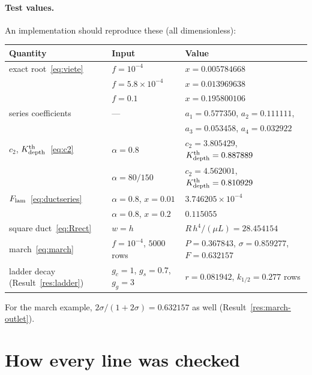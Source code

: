 \paragraph{Test values.} An implementation should reproduce these (all dimensionless):
\begin{center}
\small
\begin{tabular}{@{}lll@{}}
\toprule
Quantity & Input & Value \\
\midrule
exact root~\eqref{eq:viete} & $f=10^{-4}$ & $x=0.005784668$ \\
 & $f=5.8\times10^{-4}$ & $x=0.013969638$ \\
 & $f=0.1$ & $x=0.195800106$ \\
series coefficients & --- & $a_1=0.577350$, $a_2=0.111111$, \\
 & & $a_3=0.053458$, $a_4=0.032922$ \\
$c_2$, $K_{\mathrm{depth}}^{\mathrm{th}}$~\eqref{eq:c2} & $\alpha=0.8$ & $c_2=3.805429$, $K_{\mathrm{depth}}^{\mathrm{th}}=0.887889$ \\
 & $\alpha=80/150$ & $c_2=4.562001$, $K_{\mathrm{depth}}^{\mathrm{th}}=0.810929$ \\
$F_{\mathrm{lam}}$~\eqref{eq:ductseries} & $\alpha=0.8$, $x=0.01$ & $3.746205\times10^{-4}$ \\
 & $\alpha=0.8$, $x=0.2$ & $0.115055$ \\
square duct~\eqref{eq:Rrect} & $w=h$ & $R\,h^4/(\mu L)=28.454154$ \\
march~\eqref{eq:march} & $f=10^{-4}$, $5000$ rows & $P=0.367843$, $\sigma=0.859277$, $F=0.632157$ \\
ladder decay (Result~\ref{res:ladder}) & $g_c=1$, $g_s=0.7$, $g_g=3$ & $r=0.081942$, $k_{1/2}=0.277$ rows \\
\bottomrule
\end{tabular}
\end{center}
For the march example, $2\sigma/(1+2\sigma)=0.632157$ as well (Result~\ref{res:march-outlet}).

\section{How every line was checked}
\label{sec:verify}

